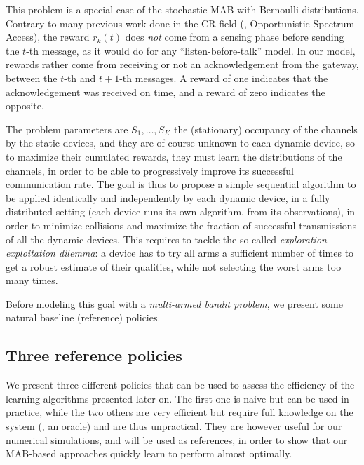 This problem is a special case of the stochastic MAB with
Bernoulli distributions.
Contrary to many previous work done in the CR field \cite{Jouini10,Jouini12} (\eg, Opportunistic Spectrum Access),
the reward $r_k(t)$ does \emph{not} come from a sensing phase before sending the $t$-th message, as it would do for any ``listen-before-talk'' model.
In our model, rewards rather come from receiving or not an acknowledgement from the gateway, between the $t$-th and $t+1$-th messages. A reward of one indicates that the acknowledgement was received on time, and a reward of zero indicates the opposite.

The problem parameters
are $S_1, \dots, S_K$ the (stationary) occupancy of the channels by the static devices,
and they are of course unknown to each dynamic device, so to maximize their cumulated rewards, they must learn the distributions of the channels, in order to be able to progressively improve its successful communication rate.
%
The goal is thus to propose a simple sequential algorithm to be applied identically and independently by each dynamic device, in a fully distributed setting (each device runs its own algorithm, from its observations), in order to minimize collisions and maximize the fraction of successful transmissions of all the dynamic devices.
%
This requires to tackle the so-called \emph{exploration-exploitation dilemma}: a device has to try all arms a sufficient number of times to get a robust estimate of their qualities, while not selecting the worst arms too many times.

Before modeling this goal with a \emph{multi-armed bandit problem}, we present some natural baseline (reference) policies.


\subsection{Three reference policies}\label{sub:41:threeReferencePolicies}

We present three different policies that can be used to assess the efficiency of the learning algorithms presented later on.
The first one is naive but can be used in practice, while the two others are very efficient but require full knowledge on the system (\ie, an oracle) and are thus unpractical.
%
They are however useful for our numerical simulations, and will be used as references, in order to show that our MAB-based approaches quickly learn to perform almost optimally.


